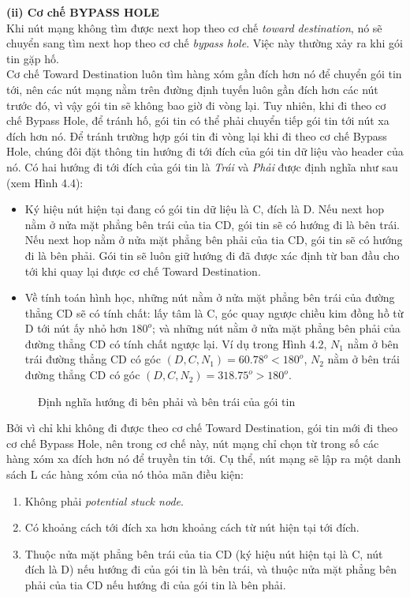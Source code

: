 \documentclass[12pt]{report}
\begin{document}
\textbf{(ii) Cơ chế BYPASS HOLE}\\
Khi nút mạng không tìm được next hop theo cơ chế \textit{toward destination}, nó sẽ chuyển sang tìm next hop theo cơ chế \textit{bypass hole}. Việc này thường xảy ra khi gói tin gặp hố.\\
Cơ chế Toward Destination luôn tìm hàng xóm gần đích hơn nó để chuyển gói tin tới, nên các nút mạng nằm trên đường định tuyến luôn gần đích hơn các nút trước đó, vì vậy gói tin sẽ không bao giờ đi vòng lại. Tuy nhiên, khi đi theo cơ chế Bypass Hole, để tránh hố, gói tin có thể phải chuyển tiếp gói tin tới nút xa đích hơn nó. Để tránh trường hợp gói tin đi vòng lại khi đi theo cơ chế Bypass Hole, chúng đôi đặt thông tin hướng đi tới đích của gói tin dữ liệu vào header của nó. Có hai hướng đi tới đích của gói tin là \textit{Trái} và \textit{Phải} được định nghĩa như sau (xem Hình 4.4):
\begin{itemize}
\item Ký hiệu nút hiện tại đang có gói tin dữ liệu là C, đích là D. Nếu next hop nằm ở nửa mặt phẳng bên trái của tia CD, gói tin sẽ có hướng đi là bên trái. Nếu next hop nằm ở nửa mặt phẳng bên phải của tia CD, gói tin sẽ có hướng đi là bên phải. Gói tin sẽ luôn giữ hướng đi đã được xác định từ ban đầu cho tới khi quay lại được cơ chế Toward Destination.
\item Về tính toán hình học, những nút nằm ở nửa mặt phẳng bên trái của đường thẳng CD sẽ có tính chất: lấy tâm là C, góc quay ngược chiều kim đồng hồ từ D tới nút ấy nhỏ hơn $180^{o}$; và những nút nằm ở nửa mặt phẳng bên phải của đường thẳng CD có tính chất ngược lại. Ví dụ trong Hình 4.2, $N_{1}$ nằm ở bên trái đường thẳng CD có góc $(D,C,N_{1}) = 60.78^{o} < 180^{o}$, $N_{2}$ nằm ở bên trái đường thẳng CD có góc $(D,C,N_{2}) = 318.75^{o} > 180^{o}$.
\end{itemize}
\begin{figure}[H]
    \centering
    
    \caption{Định nghĩa hướng đi bên phải và bên trái của gói tin}
    \label{fig:fig}
\end{figure}
Bởi vì chỉ khi không đi được theo cơ chế Toward Destination, gói tin mới đi theo cơ chế Bypass Hole, nên trong cơ chế này, nút mạng chỉ chọn từ trong số các hàng xóm xa đích hơn nó để truyền tin tới. Cụ thể, nút mạng sẽ lập ra một danh sách L các hàng xóm của nó thỏa mãn điều kiện:
\begin{enumerate}
\item Không phải \textit{potential stuck node}.
\item Có khoảng cách tới đích xa hơn khoảng cách từ nút hiện tại tới đích.
\item Thuộc nửa mặt phẳng bên trái của tia CD (ký hiệu nút hiện tại là C, nút đích là D) nếu hướng đi của gói tin là bên trái, và thuộc nửa mặt phẳng bên phải của tia CD nếu hướng đi của gói tin là bên phải.
\end{enumerate}
\end{document}
